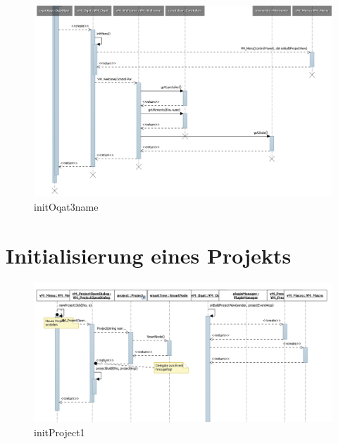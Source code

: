 \begin{figure}[H]
\includegraphics[width=\linewidth]{bilder/Sequenzdiagramm/initOqat3.png}
\caption{initOqat3name}
\end{figure}

\section{Initialisierung eines Projekts}
\begin{figure}[H]
\includegraphics[width=\linewidth]{bilder/Sequenzdiagramm/initProject1.png}
\caption{initProject1}
\end{figure}

